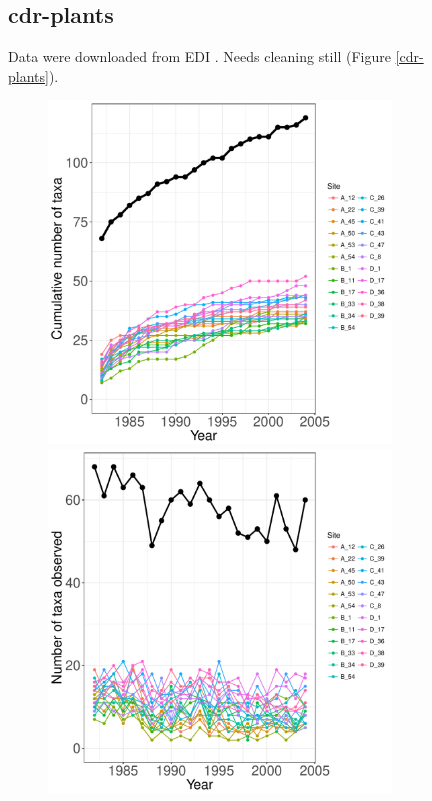 \documentclass[11pt, oneside]{article}
\begin{document}
\begin{figure}[h!]
\subsection {cdr-plants}
Data were downloaded from EDI \citep{cdr-plants}.
Needs cleaning still (Figure \ref{cdr-plants}).

\begin{figure}[h!]
\centering
\includegraphics[scale = 0.4]{cdr-plants-compagnoni_species_accumulation_curve.pdf}
\includegraphics[scale = 0.4]{cdr-plants-compagnoni_num_taxa_over_time.pdf}

\end{figure}
\end{figure}
\end{document}
